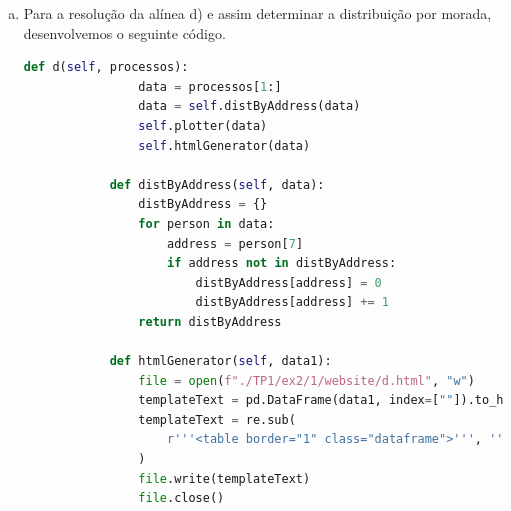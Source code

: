 \documentclass[11pt,a4paper]{report}%
\begin{document}
\begin{enumerate}
\begin{enumerate}[a)]
\begin{lstlisting}[language=python]
			def distByAgeAndGender(self, data):
				dist = {"<35": {}, ">=35": {}}
				ageIndex = 5
				genderIndex = 6
				for person in data:
					ageRange = ">=35"
					if int(person[ageIndex]) < 35:
						ageRange = "<35"
					if person[genderIndex] not in dist[ageRange]:
						dist[ageRange][person[genderIndex]] = 0
					dist[ageRange][person[genderIndex]] += 1
			return dist
			
			def htmlGenerator(self, data1):
				file = open(f"./TP1/ex2/1/website/c.html", "w")
				templateText = pd.DataFrame(data1).to_html()
				templateText = re.sub(
					r'''<table border="1" class="dataframe">''', '''<p class="title">Distribuição por idade e género</p>\n<div class="images" style="padding-bottom: 2rem;"><img src="./src/c.png" alt="">\n</div>\n<link rel="stylesheet" href="./main.css">\n<table border="1" class="dataframe">''', templateText)
				file.write(templateText)
				file.close()
			
			def plotter(self, data):
				df1 = pd.DataFrame(data)
				df1.plot(kind="bar")
				plt.savefig("./TP1/ex2/1/website/src/c.png")
		\end{lstlisting}
	
		Criamos a função auxiliar "distByAgeAndGender" que começa por criar um dicionário onde vão ser guardadas as informações, vai percorrer cada pessoa do ficheiro, verificar se a sua idade é maior ou menor que 35 anos, verificar o género dessa pessoa e incrementar na contação.
		
		\newpage
		
		\item Para a resolução da alínea d) e assim determinar a distribuição por morada, desenvolvemos o seguinte código.
		\begin{lstlisting}[language=python]
			def d(self, processos):
				data = processos[1:]
				data = self.distByAddress(data)
				self.plotter(data)
				self.htmlGenerator(data)
			
			def distByAddress(self, data):
				distByAddress = {}
				for person in data:
					address = person[7]
					if address not in distByAddress:
						distByAddress[address] = 0
						distByAddress[address] += 1
				return distByAddress
			
			def htmlGenerator(self, data1):
				file = open(f"./TP1/ex2/1/website/d.html", "w")
				templateText = pd.DataFrame(data1, index=[""]).to_html()
				templateText = re.sub(
					r'''<table border="1" class="dataframe">''', '''<p class="title">Distribuição por morada</p>\n<div class="images" style="padding-bottom: 2rem;"><img src="./src/d.png" alt="">\n</div>\n<link rel="stylesheet" href="./main.css">\n<table border="1" class="dataframe">''', templateText
				)
				file.write(templateText)
				file.close()
			

\end{lstlisting}
\end{enumerate}
\end{enumerate}
\end{document}
